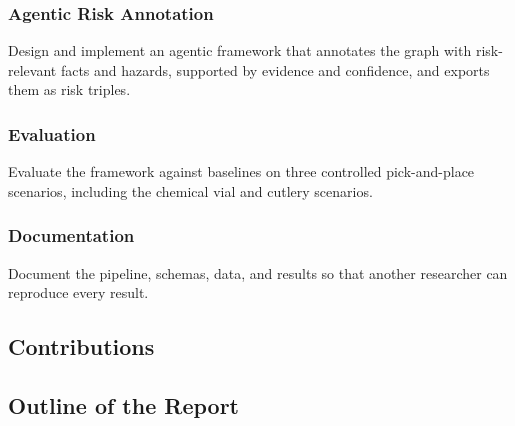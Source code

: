 \subsubsection{Agentic Risk Annotation}

Design and implement an agentic framework that annotates the graph with risk-relevant facts and hazards, supported by evidence and confidence, and exports them as risk triples.

\subsubsection{Evaluation}

Evaluate the framework against baselines on three controlled pick-and-place scenarios, including the chemical vial and cutlery scenarios.

\subsubsection{Documentation}

Document the pipeline, schemas, data, and results so that another researcher can reproduce every result.

\subsection{Contributions}

\subsection{Outline of the Report}
